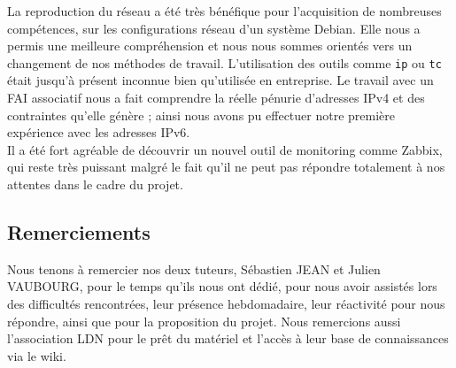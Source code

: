 		La reproduction du réseau a été très bénéfique pour l'acquisition de nombreuses compétences, sur les configurations réseau d'un système Debian. Elle nous a permis une meilleure compréhension et nous nous sommes orientés vers un changement de nos méthodes de travail. L'utilisation des outils comme \verb?ip? ou \verb?tc? était jusqu'à présent inconnue bien qu'utilisée en entreprise. Le travail avec un FAI associatif nous a fait comprendre la réelle pénurie d'adresses IPv4 et des contraintes qu'elle génère ; ainsi nous avons pu effectuer notre première expérience avec les adresses IPv6.\\

		Il a été fort agréable de découvrir un nouvel outil de monitoring comme Zabbix, qui reste très puissant malgré le fait qu'il ne peut pas répondre totalement à nos attentes dans le cadre du projet.\\

	\subsection{Remerciements}
		\vspace{0.3cm}

		Nous tenons à remercier nos deux tuteurs, Sébastien JEAN et Julien VAUBOURG, pour le temps qu'ils nous ont dédié, pour nous avoir assistés lors des difficultés rencontrées, leur présence hebdomadaire, leur réactivité pour nous répondre, ainsi que pour la proposition du projet. Nous remercions aussi l'association LDN pour le prêt du matériel et l'accès à leur base de connaissances via le wiki.

\newpage
